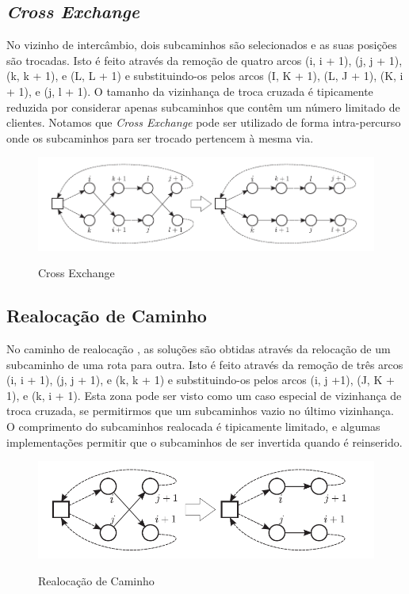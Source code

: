 \subsection{\textit{Cross Exchange}}

 No vizinho de intercâmbio, dois subcaminhos são selecionados e as suas posições são trocadas. Isto é feito através da remoção de quatro arcos (i, i + 1), (j, j + 1), (k, k + 1), e (L, L + 1) e substituindo-os pelos arcos (I, K + 1), (L, J + 1), (K, i + 1), e (j, l + 1). O tamanho da vizinhança de troca cruzada é tipicamente reduzida por considerar apenas subcaminhos que contêm um número limitado de clientes. Notamos que \textit{Cross Exchange} pode ser utilizado de forma intra-percurso onde os subcaminhos para ser trocado pertencem à mesma via.
 
\begin{figure}[ht!]
\centering
\includegraphics[scale=0.7]{figuras/opt-4.PNG}
\label{opt-4}
\caption{Cross Exchange}
\end{figure}
 
\subsection{Realocação de Caminho}
 No caminho de realocação , as soluções são obtidas através da relocação de um subcaminho de uma rota para outra. Isto é feito através da remoção de três arcos (i, i + 1), (j, j + 1), e (k, k + 1) e substituindo-os pelos arcos (i, j +1), (J, K + 1), e (k, i + 1). Esta zona pode ser visto como um caso especial de vizinhança de troca cruzada, se permitirmos que um subcaminhos vazio no último vizinhança. O comprimento do subcaminhos realocada é tipicamente limitado, e algumas implementações permitir que o subcaminhos de ser invertida quando é reinserido. 
 
\begin{figure}[ht!]
\centering
\includegraphics[scale=0.7]{figuras/opt-3.PNG}
\label{opt-5}
\caption{Realocação de Caminho}
\end{figure}
 
